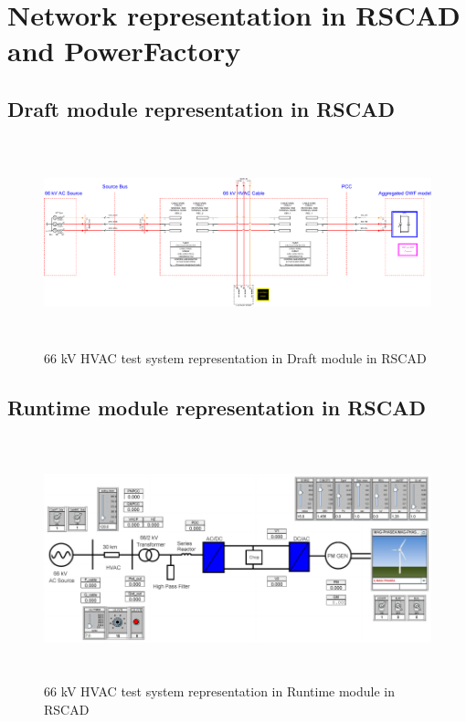 \chapter{Network representation in RSCAD and PowerFactory}

\section{Draft module representation in RSCAD}

\begin{figure}[H]
\centering
    \includegraphics[height = 6cm,width = 17.5cm]{Diagrams/Appendix_B/WT1_AC_RSCAD_network_view.pdf}
    \caption{66 kV HVAC test system representation in Draft module in RSCAD}
    \label{fig:WT1_AC_RSCAD_network_view}
\end{figure}

\section{Runtime module representation in RSCAD}
\begin{figure}[H]
\centering
    \includegraphics[height = 7cm,width = 16.5cm]{Diagrams/Appendix_B/WT1_AC_RSCAD_network_sib_view.pdf}
    \caption{66 kV HVAC test system representation in Runtime module in RSCAD}
    \label{fig:WT1_AC_RSCAD_network_sib_view}
\end{figure}


